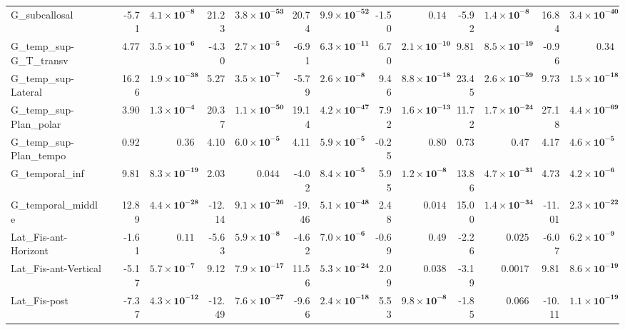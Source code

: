{\begin{longtable}{llrrrrrrrrrrrr}
G\_subcallosal &  & -5.71 & $\mathbf{4.1{\times}10^{-8}}$ & 21.23 & $\mathbf{3.8{\times}10^{-53}}$ & 20.74 & $\mathbf{9.9{\times}10^{-52}}$ & -1.50 & $0.14$ & -5.92 & $\mathbf{1.4{\times}10^{-8}}$ & 16.84 & $\mathbf{3.4{\times}10^{-40}}$ \\
G\_temp\_sup-G\_T\_transv &  & 4.77 & $\mathbf{3.5{\times}10^{-6}}$ & -4.30 & $\mathbf{2.7{\times}10^{-5}}$ & -6.91 & $\mathbf{6.3{\times}10^{-11}}$ & 6.70 & $\mathbf{2.1{\times}10^{-10}}$ & 9.81 & $\mathbf{8.5{\times}10^{-19}}$ & -0.96 & $0.34$ \\
G\_temp\_sup-Lateral &  & 16.26 & $\mathbf{1.9{\times}10^{-38}}$ & 5.27 & $\mathbf{3.5{\times}10^{-7}}$ & -5.79 & $\mathbf{2.6{\times}10^{-8}}$ & 9.46 & $\mathbf{8.8{\times}10^{-18}}$ & 23.45 & $\mathbf{2.6{\times}10^{-59}}$ & 9.73 & $\mathbf{1.5{\times}10^{-18}}$ \\
G\_temp\_sup-Plan\_polar &  & 3.90 & $\mathbf{1.3{\times}10^{-4}}$ & 20.37 & $\mathbf{1.1{\times}10^{-50}}$ & 19.14 & $\mathbf{4.2{\times}10^{-47}}$ & 7.92 & $\mathbf{1.6{\times}10^{-13}}$ & 11.72 & $\mathbf{1.7{\times}10^{-24}}$ & 27.18 & $\mathbf{4.4{\times}10^{-69}}$ \\
G\_temp\_sup-Plan\_tempo &  & 0.92 & $0.36$ & 4.10 & $\mathbf{6.0{\times}10^{-5}}$ & 4.11 & $\mathbf{5.9{\times}10^{-5}}$ & -0.25 & $0.80$ & 0.73 & $0.47$ & 4.17 & $\mathbf{4.6{\times}10^{-5}}$ \\
G\_temporal\_inf &  & 9.81 & $\mathbf{8.3{\times}10^{-19}}$ & 2.03 & $0.044$ & -4.02 & $\mathbf{8.4{\times}10^{-5}}$ & 5.95 & $\mathbf{1.2{\times}10^{-8}}$ & 13.86 & $\mathbf{4.7{\times}10^{-31}}$ & 4.73 & $\mathbf{4.2{\times}10^{-6}}$ \\
G\_temporal\_middle &  & 12.89 & $\mathbf{4.4{\times}10^{-28}}$ & -12.14 & $\mathbf{9.1{\times}10^{-26}}$ & -19.46 & $\mathbf{5.1{\times}10^{-48}}$ & 2.48 & $0.014$ & 15.00 & $\mathbf{1.4{\times}10^{-34}}$ & -11.01 & $\mathbf{2.3{\times}10^{-22}}$ \\
Lat\_Fis-ant-Horizont &  & -1.61 & $0.11$ & -5.63 & $\mathbf{5.9{\times}10^{-8}}$ & -4.62 & $\mathbf{7.0{\times}10^{-6}}$ & -0.69 & $0.49$ & -2.26 & $0.025$ & -6.07 & $\mathbf{6.2{\times}10^{-9}}$ \\
Lat\_Fis-ant-Vertical &  & -5.17 & $\mathbf{5.7{\times}10^{-7}}$ & 9.12 & $\mathbf{7.9{\times}10^{-17}}$ & 11.56 & $\mathbf{5.3{\times}10^{-24}}$ & 2.09 & $0.038$ & -3.19 & $0.0017$ & 9.81 & $\mathbf{8.6{\times}10^{-19}}$ \\
Lat\_Fis-post &  & -7.37 & $\mathbf{4.3{\times}10^{-12}}$ & -12.49 & $\mathbf{7.6{\times}10^{-27}}$ & -9.66 & $\mathbf{2.4{\times}10^{-18}}$ & 5.53 & $\mathbf{9.8{\times}10^{-8}}$ & -1.85 & $0.066$ & -10.11 & $\mathbf{1.1{\times}10^{-19}}$ \\

\end{longtable}}
